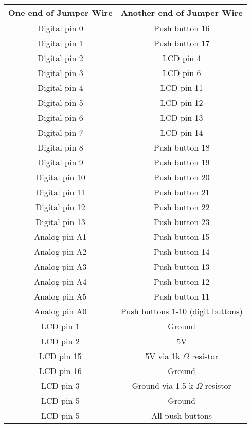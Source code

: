  \begin{table}[h!]
    \centering
    \begin{tabular}{|c|c|}
        \hline
        \textbf{One end of Jumper Wire}  & \textbf{Another end of Jumper Wire} \\
        \hline
          Digital pin 0 & Push button 16 \\
          Digital pin 1 & Push button 17 \\
          Digital pin 2 & LCD pin 4 \\
          Digital pin 3 & LCD pin 6 \\
          Digital pin 4 & LCD pin 11 \\
          Digital pin 5 & LCD pin 12 \\
          Digital pin 6 & LCD pin 13 \\
          Digital pin 7 & LCD pin 14 \\
          Digital pin 8 & Push button 18 \\
          Digital pin 9 & Push button 19 \\
          Digital pin 10 & Push button 20 \\
          Digital pin 11 & Push button 21 \\
          Digital pin 12 & Push button 22 \\
          Digital pin 13 & Push button 23 \\
          Analog pin A1 & Push button 15 \\
          Analog pin A2 & Push button 14 \\
          Analog pin A3 & Push button 13 \\
          Analog pin A4 & Push button 12 \\
          Analog pin A5 & Push button 11 \\
          Analog pin A0 & Push buttons 1-10 (digit buttons)\\
          LCD pin 1 & Ground \\
          LCD pin 2 & 5V \\
          LCD pin 15 & 5V via 1k $\Omega$ resistor \\
          LCD pin 16 & Ground \\
          LCD pin 3 & Ground via 1.5 k $\Omega$ resistor \\
          LCD pin 5 & Ground \\
          LCD pin 5 & All push buttons \\
          
        \hline
    \end{tabular}
\end{table}
